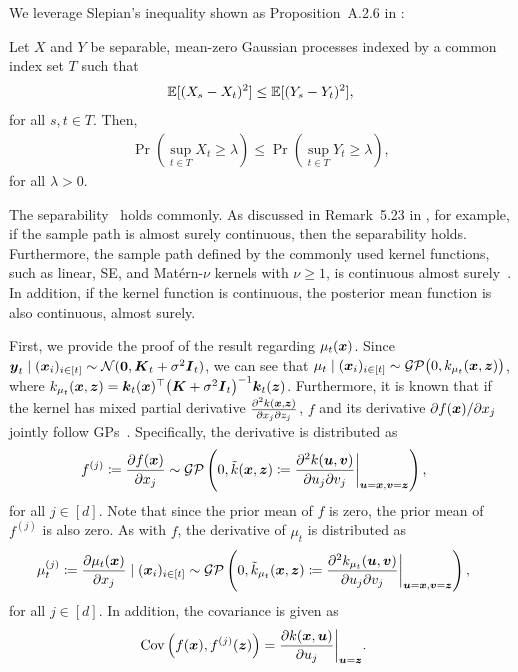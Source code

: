 We leverage Slepian's inequality shown as Proposition~A.2.6 in \citet{van1996weak}:
\begin{lemma}
    Let $X$ and $Y$ be separable, mean-zero Gaussian processes indexed by a common index set $T$ such that
    \begin{align*}
        \mathbb{E}[(X_s - X_t)^2] \leq \mathbb{E}[(Y_s - Y_t)^2],
    \end{align*}
    for all $s, t \in T$. Then,
    \begin{align*}
        \Pr\left( \sup_{t \in T} X_t \geq \lambda \right) \leq \Pr\left( \sup_{t \in T} Y_t \geq \lambda \right),
    \end{align*}
    for all $\lambda > 0$.
    \label{lem:slepian}
\end{lemma}
%
The separability~\citep[Definition~5.22 in][]{Handel-HDP} holds commonly.
%
As discussed in  Remark~5.23 in \citet{Handel-HDP}, for example, if the sample path is almost surely continuous, then the separability holds.
%
Furthermore, the sample path defined by the commonly used kernel functions, such as linear, SE, and Mat\'ern-$\nu$ kernels with $\nu \geq 1$, is continuous almost surely~\citep{dacosta2024samplep}.
%
In addition, if the kernel function is continuous, the posterior mean function is also continuous, almost surely.


First, we provide the proof of the result regarding $\mu_t(\boldsymbol{x})$.
%
Since $\boldsymbol{y}_t \mid (\boldsymbol{x}_i)_{i \in [t]} \sim {\cal N}(\boldsymbol{0}, \boldsymbol{K}_t + \sigma^2\boldsymbol{I}_t)$, we can see that $\mu_t \mid (\boldsymbol{x}_i)_{i \in [t]} \sim {\cal G} {\cal P} \bigl(0, k_{\mu_t}(\boldsymbol{x}, \boldsymbol{z}) \bigr)$, where $k_{\mu_t}(\boldsymbol{x}, \boldsymbol{z}) = \boldsymbol{k}_{t}(\boldsymbol{x}) ^\top \bigl(\boldsymbol{K} + \sigma^2 \boldsymbol{I}_{t} \bigr)^{-1} \boldsymbol{k}_{t}(\boldsymbol{z})$.
%
Furthermore, it is known that if the kernel has mixed partial derivative $\frac{\partial^2 k(\boldsymbol{x}, \boldsymbol{z})}{ \partial x_j \partial z_j}$, $f$ and its derivative $\partial f(\boldsymbol{x}) / \partial x_j$ jointly follow GPs~\citep{Rasmussen2005-Gaussian,adler1981geometry}.
%
Specifically, the derivative is distributed as
\begin{align*}
    f^{(j)} \coloneqq \frac{\partial f(\boldsymbol{x})}{\partial x_j} &\sim {\cal G} {\cal P}\left(0, \tilde{k}(\boldsymbol{x}, \boldsymbol{z}) \coloneqq \frac{\partial^2 k(\boldsymbol{u}, \boldsymbol{v})}{\partial u_j \partial v_j } \bigg|_{\boldsymbol{u}=\boldsymbol{x}, \boldsymbol{v}=\boldsymbol{z}} \right),
\end{align*}
for all $j \in [d]$.
%
Note that since the prior mean of $f$ is zero, the prior mean of $f^{(j)}$ is also zero.
%
As with $f$, the derivative of $\mu_t$ is distributed as 
\begin{align*}
    \mu_t^{(j)} \coloneqq \frac{\partial \mu_t(\boldsymbol{x})}{\partial x_j} \mid (\boldsymbol{x}_i)_{i \in [t]} &\sim {\cal G} {\cal P}\left(0, \tilde{k}_{\mu_t}(\boldsymbol{x}, \boldsymbol{z}) \coloneqq \frac{\partial^2 k_{\mu_t}(\boldsymbol{u}, \boldsymbol{v})}{\partial u_j \partial v_j } \bigg|_{\boldsymbol{u}=\boldsymbol{x}, \boldsymbol{v}=\boldsymbol{z}} \right),
\end{align*}
for all $j \in [d]$.
%
In addition, the covariance is given as
\begin{align*}
    {\rm Cov}\left( f(\boldsymbol{x}), f^{(j)}(\boldsymbol{z}) \right)
    &= \frac{\partial k(\boldsymbol{x}, \boldsymbol{u})}{\partial u_j } \bigg|_{\boldsymbol{u}=\boldsymbol{z}}.
\end{align*}


